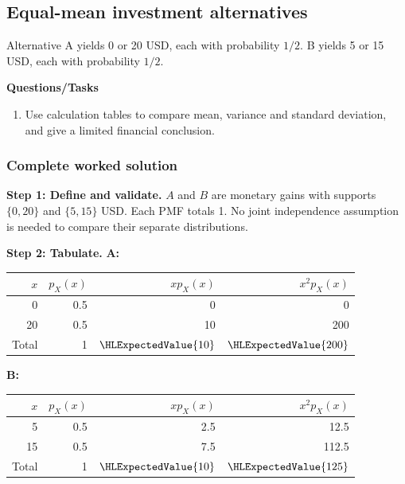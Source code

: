 \subsection{Equal-mean investment alternatives}
Alternative A yields 0 or 20 USD, each with probability $1/2$. B yields 5 or 15 USD, each with probability $1/2$.

\textbf{Questions/Tasks}
\begin{enumerate}
\item Use calculation tables to compare mean, variance and standard deviation, and give a limited financial conclusion.
\end{enumerate}
\subsubsection*{Complete worked solution}
\par\noindent\begin{minipage}{\linewidth}
\textbf{Step 1: Define and validate.} $A$ and $B$ are monetary gains with supports $\{0,20\}$ and $\{5,15\}$ USD. Each PMF totals 1. No joint independence assumption is needed to compare their separate distributions.
\end{minipage}\par\medskip
\par\noindent\begin{minipage}{\linewidth}
\textbf{Step 2: Tabulate.} \textbf{A:}\begin{center}
\begin{tabular}{rrrr}
\toprule
$x$ & $p_X(x)$ & $xp_X(x)$ & $x^2p_X(x)$ \\ \midrule
0 & 0.5 & 0 & 0 \\
20 & 0.5 & 10 & 200 \\
Total & 1 & $\HLExpectedValue{10}$ & $\HLExpectedValue{200}$ \\
\bottomrule
\end{tabular}
\end{center}
\textbf{B:}\begin{center}
\begin{tabular}{rrrr}
\toprule
$x$ & $p_X(x)$ & $xp_X(x)$ & $x^2p_X(x)$ \\ \midrule
5 & 0.5 & 2.5 & 12.5 \\
15 & 0.5 & 7.5 & 112.5 \\
Total & 1 & $\HLExpectedValue{10}$ & $\HLExpectedValue{125}$ \\
\bottomrule
\end{tabular}
\end{center}

\end{minipage}\par\medskip
